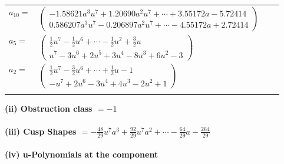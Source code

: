 \documentclass[1p]{elsarticle_modified}
\theoremstyle{definition}
\begin{document}
\begin{tabular}{m{7pt} m{180pt} m{7pt} m{180pt} }
\flushright $a_{10}=$&$\begin{pmatrix}-1.58621 a^{3} u^{7}+1.20690 a^{2} u^{7}+\cdots+3.55172 a-5.72414\\0.586207 a^{3} u^{7}-0.206897 a^{2} u^{7}+\cdots-4.55172 a+2.72414\end{pmatrix}$ \\
\flushright $a_{5}=$&$\begin{pmatrix}\frac{1}{2} u^7-\frac{1}{2} u^6+\cdots-\frac{1}{2} u^2+\frac{3}{2} u\\u^7-3 u^6+2 u^5+3 u^4-8 u^3+6 u^2-3\end{pmatrix}$ \\
\flushright $a_{2}=$&$\begin{pmatrix}\frac{1}{2} u^7-\frac{3}{2} u^6+\cdots+\frac{1}{2} u-1\\- u^7+2 u^6-3 u^4+4 u^3-2 u^2+1\end{pmatrix}$\\&\end{tabular}
\flushleft \textbf{(ii) Obstruction class $= -1$}\\~\\
\flushleft \textbf{(iii) Cusp Shapes $= -\frac{48}{29} u^7 a^3+\frac{92}{29} u^7 a^2+\cdots-\frac{64}{29} a-\frac{264}{29}$}\\~\\
\newpage\renewcommand{\arraystretch}{1}
\flushleft \textbf{(iv) u-Polynomials at the component}\newline \\
\end{document}
